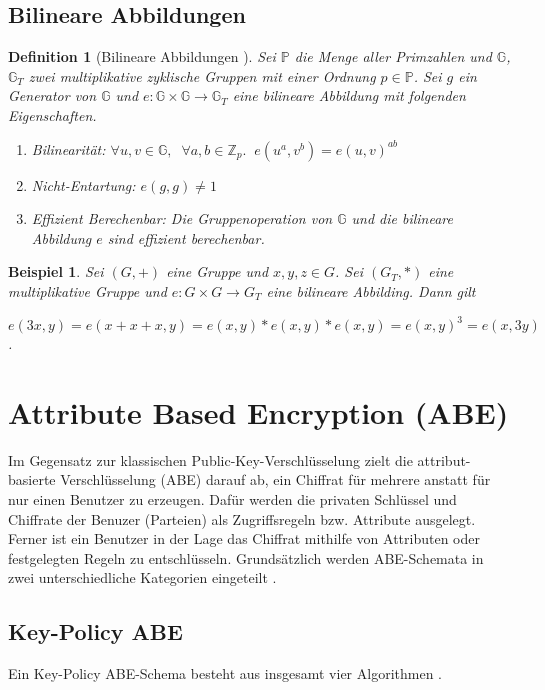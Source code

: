 \documentclass{hsflensburg}
\newtheorem{definition}{Definition}
\newtheorem*{example}{Beispiel}
\begin{document}
	\subsection{Bilineare Abbildungen}
	\begin{definition}[Bilineare Abbildungen \cite{abe}]
		Sei $\mathbb{P}$ die Menge aller Primzahlen und $\mathbb{G}$, $\mathbb{G}_T$
		zwei multiplikative zyklische Gruppen mit einer Ordnung $p \in \mathbb{P}$.
		Sei $g$ ein Generator von $\mathbb{G}$ und $e: \mathbb{G} \times \mathbb{G}
		\to \mathbb{G}_T$ eine bilineare Abbildung mit folgenden Eigenschaften.

		\begin{enumerate}
			\item Bilinearität: $\forall u, v \in \mathbb{G},\;\; \forall a, b \in
				\mathbb{Z}_p. \;\; e(u^a, v^b) = e(u, v)^{ab}$
			\item Nicht-Entartung: $e(g, g) \neq 1$
			\item Effizient Berechenbar: Die Gruppenoperation von $\mathbb{G}$ und die
				bilineare Abbildung $e$ sind effizient berechenbar.
		\end{enumerate}
	\end{definition}

	\begin{example}
		Sei $(G, +)$ eine Gruppe und $x, y, z \in G$. Sei $(G_T, *)$ eine multiplikative
		Gruppe und $e: G \times G \to G_T$ eine bilineare Abbilding. Dann gilt

		$e(3x, y) = e(x+x+x, y) = e(x, y) * e(x, y) * e(x, y) = e(x, y)^3 = e(x,
		3y)$.
	\end{example}

	\section{Attribute Based Encryption (ABE)}
	Im Gegensatz zur klassischen Public-Key-Verschlüsselung zielt die
	attribut-basierte Verschlüsselung (ABE) darauf ab, ein Chiffrat für mehrere anstatt
	für nur einen Benutzer zu erzeugen. Dafür werden die privaten Schlüssel und
	Chiffrate der Benuzer (Parteien) als Zugriffsregeln bzw. Attribute ausgelegt.
	Ferner ist ein Benutzer in der Lage das Chiffrat mithilfe von Attributen oder
	festgelegten Regeln zu entschlüsseln. Grundsätzlich werden ABE-Schemata in
	zwei unterschiedliche Kategorien eingeteilt \cite{phoabe}.

	\subsection{Key-Policy ABE}
	Ein Key-Policy ABE-Schema besteht aus insgesamt vier Algorithmen \cite{kp-abe}.
\end{document}

